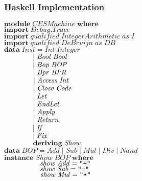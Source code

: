 \documentclass[10pt]{article}
\newcommand{\Conid}[1]{\mathit{#1}}
\newcommand{\Varid}[1]{\mathit{#1}}
\begin{document}
\subsubsection{Haskell Implementation}
\begin{hscode}\SaveRestoreHook
${\mathbf{module}\;\Conid{CESMachine}\;\mathbf{where}}$\\
${\mathbf{import}\;\Conid{\Conid{Debug}.Trace}}$\\
${\mathbf{import}\;\Varid{qualified}\;\Conid{IntegerArithmetic}\;\Varid{as}\;\Conid{I}}$\\
${\mathbf{import}\;\Varid{qualified}\;\Conid{DeBruijn}\;\Varid{as}\;\Conid{DB}}$\\
${}$\\
${\mathbf{data}\;\Conid{Inst}\mathrel{=}\Conid{Int}\;\Conid{Integer}}$\\
${\hskip4.00em\relax\mid \Conid{Bool}\;\Conid{Bool}}$\\
${\hskip4.00em\relax\mid \Conid{Bop}\;\Conid{BOP}}$\\
${\hskip4.00em\relax\mid \Conid{Bpr}\;\Conid{BPR}}$\\
${\hskip4.00em\relax\mid \Conid{Access}\;\Conid{Int}}$\\
${\hskip4.00em\relax\mid \Conid{Close}\;\Conid{Code}}$\\
${\hskip4.00em\relax\mid \Conid{Let}}$\\
${\hskip4.00em\relax\mid \Conid{EndLet}}$\\
${\hskip4.00em\relax\mid \Conid{Apply}}$\\
${\hskip4.00em\relax\mid \Conid{Return}}$\\
${\hskip4.00em\relax\mid \Conid{If}}$\\
${\hskip4.00em\relax\mid \Conid{Fix}}$\\
${\hskip4.00em\relax\mathbf{deriving}\;\Conid{Show}}$\\
${}$\\
${\mathbf{data}\;\Conid{BOP}\mathrel{=}\Conid{Add}\mid \Conid{Sub}\mid \Conid{Mul}\mid \Conid{Div}\mid \Conid{Nand}}$\\
${\mathbf{instance}\;\Conid{Show}\;\Conid{BOP}\;\mathbf{where}}$\\
${\hskip5.00em\relax\Varid{show}\;\Conid{Add}\mathrel{=}\text{\tt \char34 +\char34}}$\\
${\hskip5.00em\relax\Varid{show}\;\Conid{Sub}\mathrel{=}\text{\tt \char34 -\char34}}$\\
${\hskip5.00em\relax\Varid{show}\;\Conid{Mul}\mathrel{=}\text{\tt \char34 *\char34}}$\\

\end{hscode}
\end{document}
